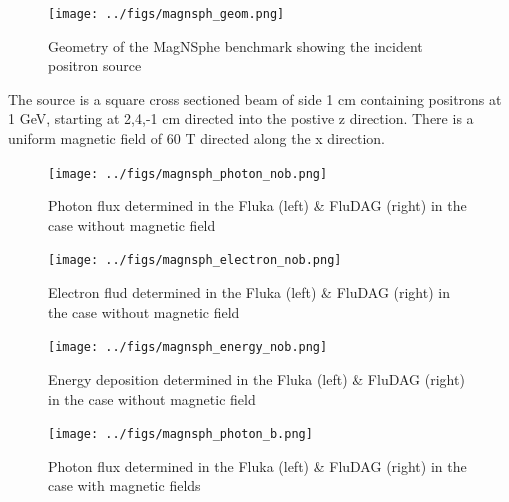 \begin{figure}[ht!]
 \begin{centering}
 \centering
 \texttt{[image: ../figs/magnsph\_geom.png]}
 \caption{Geometry of the MagNSphe benchmark showing the incident positron source}
 \label{fig:magnsph_geom}
 \end{centering}
\end{figure}

The source is a square cross sectioned beam of side 1 cm containing positrons at 1 GeV, starting at 2,4,-1 cm directed into the postive
z direction. There is a uniform magnetic field of 60 T directed along the x direction. 

\begin{figure}[ht!]
 \begin{centering}
 \centering
 \texttt{[image: ../figs/magnsph\_photon\_nob.png]}
 \caption{Photon flux determined in the Fluka (left) \& FluDAG (right) in the
          case without magnetic field}
 \label{fig:magnsph_photon_nob}
 \end{centering}
\end{figure}

\begin{figure}[ht!]
 \begin{centering}
 \centering
 \texttt{[image: ../figs/magnsph\_electron\_nob.png]}
 \caption{Electron flud determined in the Fluka (left) \& FluDAG (right) in the
          case without magnetic field}
 \label{fig:magnsph_electron_nob}
 \end{centering}
\end{figure}

\begin{figure}[ht!]
 \begin{centering}
 \centering
 \texttt{[image: ../figs/magnsph\_energy\_nob.png]}
 \caption{Energy deposition determined in the Fluka (left) \& FluDAG (right) in
          the case without magnetic field}
 \label{fig:magnsph_energy_nob}
 \end{centering}
\end{figure}

\begin{figure}[ht!]
 \begin{centering}
 \centering
 \texttt{[image: ../figs/magnsph\_photon\_b.png]}
 \caption{Photon flux determined in the Fluka (left) \& FluDAG (right) in the
          case with magnetic fields}
 \label{fig:magnsph_photon_b}
 \end{centering}
\end{figure}

